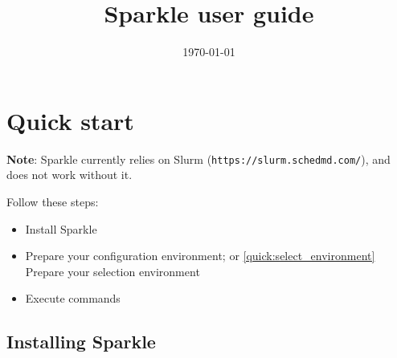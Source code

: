 \documentclass{article}
\title{Sparkle user guide}
\date{\today}
\begin{document}
\maketitle

\section{Quick start}

\textbf{Note}: Sparkle currently relies on Slurm (\texttt{https://slurm.schedmd.com/}), and does not work without it.

Follow these steps:

\begin{itemize}
  \item[\ref{quick:install}] Install Sparkle
  \item[\ref{quick:config_environment}] Prepare your configuration environment; or \ref{quick:select_environment} Prepare your selection environment
  \item[\ref{quick:execute_commands}] Execute commands
\end{itemize}

\subsection{Installing Sparkle}
\label{quick:install}
\end{document}
